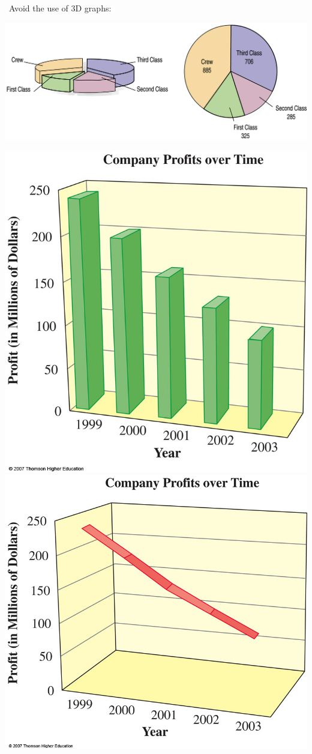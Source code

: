 \documentclass[../mathNotesPreamble]{subfiles}
\begin{document}
  \noindent\textbullet\ Avoid the use of 3D graphs:
  \begin{center}
    \includegraphics[width=0.9\linewidth]{images/math211_3d_pie_chart}

    \includegraphics[width=0.35\linewidth]{images/math211_3d_bar_chart}
    \includegraphics[width=0.35\linewidth]{images/math211_3d_line_chart}
  \end{center}

  \pagebreak
\end{document}
